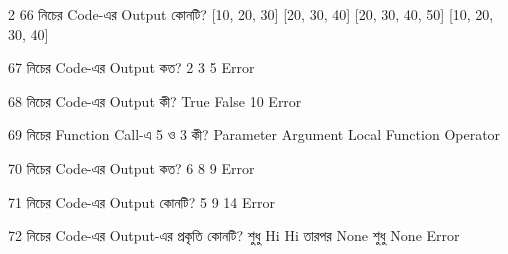 \begin{multicols}{2}
\mcqwide
{66}
{নিচের Code-এর Output কোনটি?}
{[10, 20, 30]}
{[20, 30, 40]}
{[20, 30, 40, 50]}
{[10, 20, 30, 40]}

\mcqwide
{67}
{নিচের Code-এর Output কত?}
{2}
{3}
{5}
{Error}

\mcqwide
{68}
{নিচের Code-এর Output কী?}
{True}
{False}
{10}
{Error}

\mcqwide
{69}
{নিচের Function Call-এ 5 ও 3 কী?}
{Parameter}
{Argument}
{Local Function}
{Operator}

\mcqwide
{70}
{নিচের Code-এর Output কত?}
{6}
{8}
{9}
{Error}

\mcqwide
{71}
{নিচের Code-এর Output কোনটি?}
{5}
{9}
{14}
{Error}

\mcqwide
{72}
{নিচের Code-এর Output-এর প্রকৃতি কোনটি?}
{শুধু Hi}
{Hi তারপর None}
{শুধু None}
{Error}

\end{multicols}
\begingroup
\setlength{\tabcolsep}{2.4pt}
\renewcommand{\arraystretch}{1.08}
